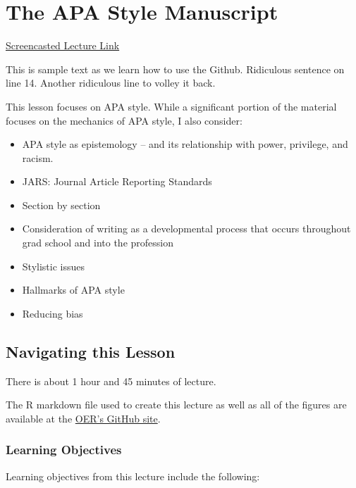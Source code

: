 \documentclass[
  11pt,
]{book}
\providecommand{\tightlist}{%
  \setlength{\itemsep}{0pt}\setlength{\parskip}{0pt}}
\begin{document}
\hypertarget{APAstyle}{%
\chapter{The APA Style Manuscript}\label{APAstyle}}

\href{https://spu.hosted.panopto.com/Panopto/Pages/Viewer.aspx?pid=8ca9d96d-0ff6-4068-a570-ac290189a4d4}{Screencasted Lecture Link}

This is sample text as we learn how to use the Github.
Ridiculous sentence on line 14. Another ridiculous line to volley it back.

This lesson focuses on APA style. While a significant portion of the material focuses on the mechanics of APA style, I also consider:

\begin{itemize}
\tightlist
\item
  APA style as epistemology -- and its relationship with power, privilege, and racism.
\item
  JARS: Journal Article Reporting Standards
\item
  Section by section
\item
  Consideration of writing as a developmental process that occurs throughout grad school and into the profession
\item
  Stylistic issues
\item
  Hallmarks of APA style
\item
  Reducing bias
\end{itemize}

\hypertarget{navigating-this-lesson}{%
\section{Navigating this Lesson}\label{navigating-this-lesson}}

There is about 1 hour and 45 minutes of lecture.

The R markdown file used to create this lecture as well as all of the figures are available at the \href{https://github.com/lhbikos/ReC_Topics}{OER's GitHub site}.

\hypertarget{learning-objectives}{%
\subsection{Learning Objectives}\label{learning-objectives}}

Learning objectives from this lecture include the following:
\end{document}
